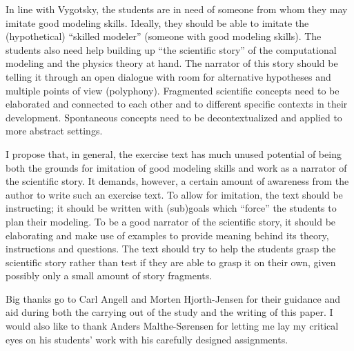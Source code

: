 \documentclass[aps,prb,floatfix,twocolumn,twoside,english]{revtex4-1}
\begin{document}
In line with Vygotsky, the students are in need of someone from whom they may imitate good modeling skills. Ideally, they should be able to imitate the (hypothetical) ``skilled modeler'' (someone with good modeling skills). The students also need help building up ``the scientific story'' of the computational modeling and the physics theory at hand. The narrator of this story should be telling it through an open dialogue with room for alternative hypotheses and multiple points of view (polyphony). Fragmented scientific concepts need to be elaborated and connected to each other and to different specific contexts in their development. Spontaneous concepts need to be decontextualized and applied to more abstract settings.

I propose that, in general, the exercise text has much unused potential of being both the grounds for imitation of good modeling skills and work as a narrator of the scientific story. It demands, however, a certain amount of awareness from the author to write such an exercise text. To allow for imitation, the text should be instructing; it should be written with (sub)goals which ``force'' the students to plan their modeling. To be a good narrator of the scientific story, it should be elaborating and make use of examples to provide meaning behind its theory, instructions and questions. The text should try to help the students grasp the scientific story rather than test if they are able to grasp it on their own, given possibly only a small amount of story fragments.


\begin{acknowledgments}
Big thanks go to Carl Angell and Morten Hjorth-Jensen for their guidance and aid during both the carrying out of the study and the writing of this paper. I would also like to thank Anders Malthe-S\o rensen for letting me lay my critical eyes on his students' work with his carefully designed assignments.
\end{acknowledgments}
\end{document}
